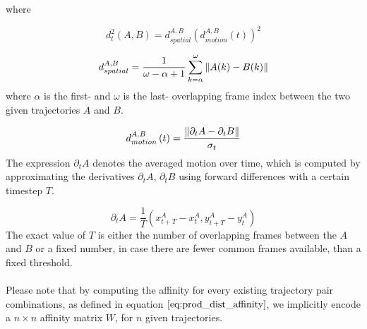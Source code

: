 where

\begin{equation}
	d_t^2 \left( A, B \right) = d_{spatial}^{A,B} \left( d_{motion}^{A,B} (t) \right) ^2
\end{equation}

\begin{equation}
	d_{spatial}^{A,B} = \frac{1}{\omega - \alpha + 1} \sum_{k=\alpha}^\omega \left\lVert A(k) - B(k)\right\rVert
\label{eq:spatial_distance}	
\end{equation}
where $\alpha$ is the first- and $\omega$ is the last- overlapping frame index between the two given trajectories $A$ and $B$.

\begin{equation}
	d_{motion}^{A,B} \left( t \right)  = \frac{\left\lVert\partial_t A - \partial_t B\right\rVert}{\sigma_t}
\label{eq:motion_distance}
\end{equation}
The expression $\partial_t A$ denotes the averaged motion over time, which is computed by approximating the derivatives $\partial_t A$, $\partial_t B$ using forward differences with a certain timestep $T$.

\begin{equation}
	\partial_t A = \frac{1}{T} \left( x_{t+T}^{A} - x_{t}^{A}, y_{t+T}^{A} - y_{t}^{A}\right)
\end{equation}
The exact value of $T$ is either the number of overlapping frames between the $A$ and $B$ or a fixed number, in case there are fewer common frames available, than a fixed threshold. \\ \\
Please note that by computing the affinity for every existing trajectory pair combinations, as defined in equation $\ref{eq:prod_dist_affinity}$, we implicitly encode a $n \times n$ affinity matrix $W$, for $n$ given trajectories. 

